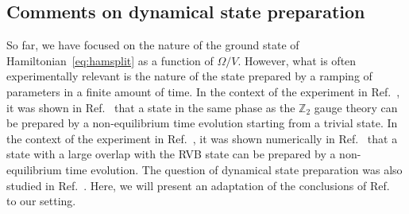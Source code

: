 \documentclass[twocolumn,superscriptaddress,amsmath,amssymb,aps,prx,nofootinbib]{revtex4-2}
\begin{document}
\subsection{Comments on dynamical state preparation}\label{sec:dynamics}
So far, we have focused on the nature of the ground state of Hamiltonian~\eqref{eq:hamsplit} as a function of $\Omega/V$. However, what is often experimentally relevant is the nature of the state prepared by a ramping of parameters in a finite amount of time. In the context of the experiment in Ref.~\cite{semeghini2021}, it was shown in Ref.~\cite{giudici2022dynamical,sahay2022quantum} that a state in the same phase as the $\mathbb{Z}_2$ gauge theory can be prepared by a non-equilibrium time evolution starting from a trivial state.
In the context of the experiment in Ref.~\cite{semeghini2021}, it was shown numerically in Ref.~\cite{giudici2022dynamical} that a state with a large overlap with the RVB state can be prepared by a non-equilibrium time evolution.
The question of dynamical state preparation was also studied in Ref.~\cite{sahay2022quantum}.
Here, we will present an adaptation of the conclusions of Ref.~\cite{sahay2022quantum} to our setting. 
\end{document}
